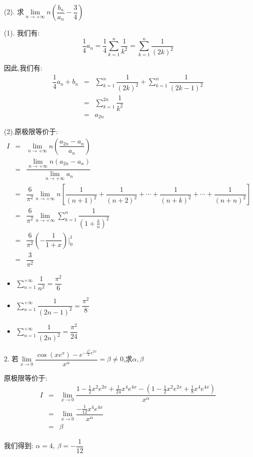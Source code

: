 (2). 求$\lim\limits_{n\rightarrow+\infty}n\left( \dfrac{b_{n}}{a_{n}}-\dfrac{3}{4}\right) $
\begin{solution}
	
	(1). 我们有: $$\dfrac{1}{4}a_{n}=\dfrac{1}{4}\sum\limits_{k=1}^{n}\dfrac{1}{k^2}=\sum\limits_{k=1}^{n}\dfrac{1}{(2k)^2}$$
	
	因此,我们有: 
	\begin{eqnarray*}
		\dfrac{1}{4}a_{n}+b_{n}&=&\sum\limits_{k=1}^{n}\dfrac{1}{(2k)^2}+\sum\limits_{k=1}^{n}\dfrac{1}{(2k-1)^2}\\
		&=&\sum\limits_{k=1}^{2n}\dfrac{1}{k^2}\\
		&=&a_{2n}
	\end{eqnarray*}
	
	(2).原极限等价于: 
	\begin{eqnarray*}
		I&=&\lim\limits_{n\rightarrow+\infty}n\left( \dfrac{a_{2n}-a_{n}}{a_{n}}\right)\\
		&=&\dfrac{\lim\limits_{n\rightarrow+\infty}n(a_{2n}-a_{n})}{\lim\limits_{n\rightarrow+\infty}a_{n}}\\
		&=&\dfrac{6}{\pi^2}\lim\limits_{n\rightarrow+\infty}n\left[ \dfrac{1}{(n+1)^2}+\dfrac{1}{(n+2)^2}+\cdots+\dfrac{1}{(n+k)^2}+\cdots+\dfrac{1}{(n+n)^2}\right]\\
		&=& \dfrac{6}{\pi^2}\lim\limits_{n\rightarrow+\infty}\sum\limits_{k=1}^{n}\dfrac{1}{(1+\frac{k}{n})^2}\\
		&=&\dfrac{6}{\pi^2}(-\dfrac{1}{1+x})|_{0}^{1}\\
		&=&\dfrac{3}{\pi^2}
	\end{eqnarray*}
\end{solution}
\begin{anymark}[注]
	\begin{itemize}
		\item $\sum\limits_{n=1}^{+\infty}\dfrac{1}{n^2}=\dfrac{\pi^2}{6}$
		\item $\sum\limits_{n=1}^{+\infty}\dfrac{1}{(2n-1)^2}=\dfrac{\pi^2}{8}$
		\item $\sum\limits_{n=1}^{+\infty}\dfrac{1}{(2n)^2}=\dfrac{\pi^2}{24}$
	\end{itemize}
\end{anymark}

2. 若$\lim\limits_{x\rightarrow 0}\dfrac{\cos(xe^x)-e^{-\frac{x^2}{2}e^{2x}}}{x^{\alpha}}=\beta\neq0$,求$\alpha,\beta$
\begin{solution}
	
	原极限等价于: 
	\begin{eqnarray*}
		I&=&\lim\limits_{x\rightarrow 0}\dfrac{1-\frac{1}{2}x^2e^{2x}+\frac{1}{24}x^4e^{4x}-(1-\frac{1}{2}x^2e^{2x}+\frac{1}{8}x^4e^{4x})}{x^{\alpha}}\\
		&=&\lim\limits_{x\rightarrow 0}\dfrac{-\frac{1}{12}x^4e^{4x}}{x^{\alpha}}\\
		&=&\beta
	\end{eqnarray*}
	
	我们得到: $\alpha=4,\ \beta=-\dfrac{1}{12}$
\end{solution}


